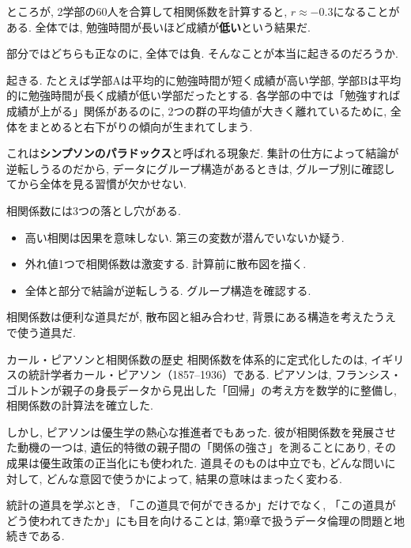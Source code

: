 ところが, 2学部の60人を合算して相関係数を計算すると, $r \approx -0.3$になることがある.
全体では, 勉強時間が長いほど成績が\textbf{低い}という結果だ.

部分ではどちらも正なのに, 全体では負.
そんなことが本当に起きるのだろうか.


起きる.
たとえば学部Aは平均的に勉強時間が短く成績が高い学部, 学部Bは平均的に勉強時間が長く成績が低い学部だったとする.
各学部の中では「勉強すれば成績が上がる」関係があるのに, 2つの群の平均値が大きく離れているために, 全体をまとめると右下がりの傾向が生まれてしまう.

これは\textbf{シンプソンのパラドックス}と呼ばれる現象だ.
集計の仕方によって結論が逆転しうるのだから, データにグループ構造があるときは, グループ別に確認してから全体を見る習慣が欠かせない.

\vspace{1em}

相関係数には3つの落とし穴がある.

\begin{itemize}
  \item 高い相関は因果を意味しない. 第三の変数が潜んでいないか疑う.
  \item 外れ値1つで相関係数は激変する. 計算前に散布図を描く.
  \item 全体と部分で結論が逆転しうる. グループ構造を確認する.
\end{itemize}

相関係数は便利な道具だが, 散布図と組み合わせ, 背景にある構造を考えたうえで使う道具だ.

\begin{mybox}{カール・ピアソンと相関係数の歴史}
相関係数を体系的に定式化したのは, イギリスの統計学者カール・ピアソン（1857--1936）である.
ピアソンは, フランシス・ゴルトンが親子の身長データから見出した「回帰」の考え方を数学的に整備し, 相関係数の計算法を確立した.

しかし, ピアソンは優生学の熱心な推進者でもあった.
彼が相関係数を発展させた動機の一つは, 遺伝的特徴の親子間の「関係の強さ」を測ることにあり, その成果は優生政策の正当化にも使われた.
道具そのものは中立でも, どんな問いに対して, どんな意図で使うかによって, 結果の意味はまったく変わる.

統計の道具を学ぶとき, 「この道具で何ができるか」だけでなく, 「この道具がどう使われてきたか」にも目を向けることは, 第9章で扱うデータ倫理の問題と地続きである.
\end{mybox}


